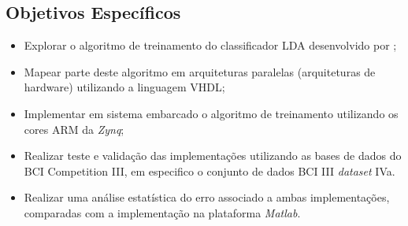 \subsection{Objetivos Específicos}

\begin{itemize}
	\item Explorar o algoritmo de treinamento do classificador LDA desenvolvido por \cite{F.Lotte};
	\item Mapear parte deste algoritmo em arquiteturas paralelas (arquiteturas de hardware) utilizando a linguagem VHDL;
	\item Implementar em sistema embarcado o algoritmo de treinamento utilizando os cores ARM da \textit{Zynq};
	\item Realizar teste e validação das implementações utilizando as bases de dados do BCI Competition III, em especifico o conjunto de dados BCI III \textit{dataset} IVa.
	\item Realizar uma análise estatística do erro associado a ambas implementações, comparadas com a implementação na plataforma \textit{Matlab}.
\end{itemize}
